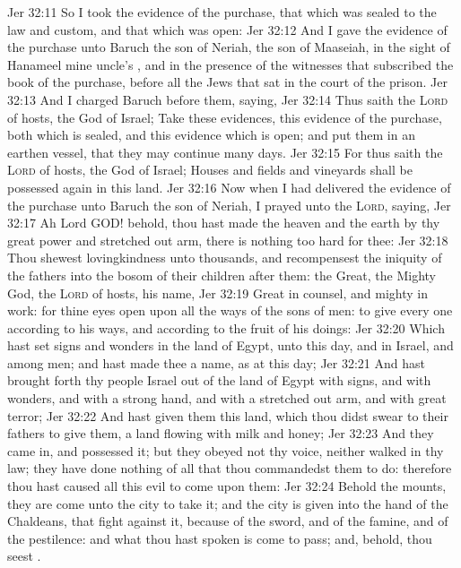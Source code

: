 \vs Jer 32:11 So I took the evidence of the purchase,  that which was sealed  to the law and custom, and that which was open:
\vs Jer 32:12 And I gave the evidence of the purchase unto Baruch the son of Neriah, the son of Maaseiah, in the sight of Hanameel mine uncle's , and in the presence of the witnesses that subscribed the book of the purchase, before all the Jews that sat in the court of the prison.
\vs Jer 32:13 And I charged Baruch before them, saying,
\vs Jer 32:14 Thus saith the \textsc{Lord} of hosts, the God of Israel; Take these evidences, this evidence of the purchase, both which is sealed, and this evidence which is open; and put them in an earthen vessel, that they may continue many days.
\vs Jer 32:15 For thus saith the \textsc{Lord} of hosts, the God of Israel; Houses and fields and vineyards shall be possessed again in this land.
\vs Jer 32:16 Now when I had delivered the evidence of the purchase unto Baruch the son of Neriah, I prayed unto the \textsc{Lord}, saying,
\vs Jer 32:17 Ah Lord GOD! behold, thou hast made the heaven and the earth by thy great power and stretched out arm,  there is nothing too hard for thee:
\vs Jer 32:18 Thou shewest lovingkindness unto thousands, and recompensest the iniquity of the fathers into the bosom of their children after them: the Great, the Mighty God, the \textsc{Lord} of hosts,  his name,
\vs Jer 32:19 Great in counsel, and mighty in work: for thine eyes  open upon all the ways of the sons of men: to give every one according to his ways, and according to the fruit of his doings:
\vs Jer 32:20 Which hast set signs and wonders in the land of Egypt,  unto this day, and in Israel, and among  men; and hast made thee a name, as at this day;
\vs Jer 32:21 And hast brought forth thy people Israel out of the land of Egypt with signs, and with wonders, and with a strong hand, and with a stretched out arm, and with great terror;
\vs Jer 32:22 And hast given them this land, which thou didst swear to their fathers to give them, a land flowing with milk and honey;
\vs Jer 32:23 And they came in, and possessed it; but they obeyed not thy voice, neither walked in thy law; they have done nothing of all that thou commandedst them to do: therefore thou hast caused all this evil to come upon them:
\vs Jer 32:24 Behold the mounts, they are come unto the city to take it; and the city is given into the hand of the Chaldeans, that fight against it, because of the sword, and of the famine, and of the pestilence: and what thou hast spoken is come to pass; and, behold, thou seest .
